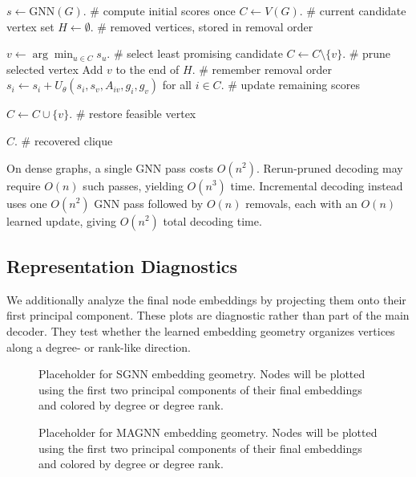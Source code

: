 \begin{algorithmic}[1]
  \State $s \leftarrow \mathrm{GNN}(G)$. \# compute initial scores once
  \State $C \leftarrow V(G)$. \# current candidate vertex set
  \State $H \leftarrow \emptyset$. \# removed vertices, stored in removal order

  \State $v \leftarrow \arg\min_{u\in C} s_u$. \# select least promising candidate
  \State $C \leftarrow C\setminus\{v\}$. \# prune selected vertex
  \State Add $v$ to the end of $H$. \# remember removal order
  \State $s_i \leftarrow s_i + U_\theta(s_i,s_v,A_{iv},g_i,g_v)$ for all $i\in C$. \# update remaining scores
  \EndWhile

  \State $C \leftarrow C\cup\{v\}$. \# restore feasible vertex
  \EndIf
  \EndFor

  \State \Return $C$. \# recovered clique
\end{algorithmic}

On dense graphs, a single GNN pass costs $O(n^2)$. Rerun-pruned decoding may require $O(n)$ such passes, yielding $O(n^3)$ time. Incremental decoding instead uses one $O(n^2)$ GNN pass followed by $O(n)$ removals, each with an $O(n)$ learned update, giving $O(n^2)$ total decoding time.

\subsection{Representation Diagnostics}

We additionally analyze the final node embeddings by projecting them onto their first principal component. These plots are diagnostic rather than part of the main decoder. They test whether the learned embedding geometry organizes vertices along a degree- or rank-like direction.

\begin{figure}[t]
  \centering
  \caption{Placeholder for SGNN embedding geometry. Nodes will be plotted using the first two principal components of their final embeddings and colored by degree or degree rank.}
  \label{fig:sgnn-pca-placeholder}
\end{figure}

\begin{figure}[t]
  \centering
  \caption{Placeholder for MAGNN embedding geometry. Nodes will be plotted using the first two principal components of their final embeddings and colored by degree or degree rank.}
  \label{fig:magnn-pca-placeholder}
\end{figure}

